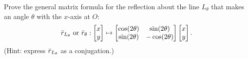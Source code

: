 \documentclass{subfiles}
\begin{document}
Prove the general matrix formula for the reflection about the line $L_{\theta}$ that makes an angle $\theta$ with the $x$-axis at $O$:
\[
	\bar{r}_{L_{\theta}} \mbox{ or } \bar{r}_{\theta}:
	\begin{bmatrix}x\\ y\end{bmatrix} \mapsto
	\begin{bmatrix}
		\cos(2\theta) & \sin(2\theta)  \\
		\sin(2\theta) & -\cos(2\theta)
	\end{bmatrix}
	\begin{bmatrix}x\\ y\end{bmatrix}
	.\]
(Hint: express $\bar{r}_{L_{\theta}}$ as a conjugation.)
\end{document}
